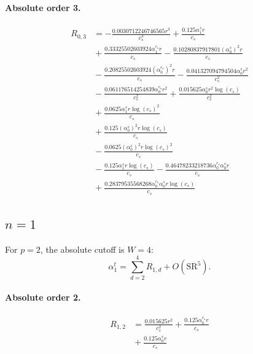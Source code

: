 \documentclass[10pt]{article}
\begin{document}
\paragraph{Absolute order 3.}
\begin{align*}
R_{0,3} &=  - \frac{0.0030712246746565 r^{3}}{c_{s}^{3}} + \frac{0.125 \alpha_{1}^s r}{c_{s}} \\
&{}  + \frac{0.33325502603924 \alpha_{1}^{c_s} r}{c_{s}} - \frac{0.10280837917801 \left(\alpha_{0}^s\right)^{2} r}{c_{s}} \\
&{}  - \frac{0.20825502603924 \left(\alpha_{0}^{c_s}\right)^{2} r}{c_{s}} - \frac{0.041327094794504 \alpha_{0}^s r^{2}}{c_{s}^{2}} \\
&{}  - \frac{0.061176514254839 \alpha_{0}^{c_s} r^{2}}{c_{s}^{2}} + \frac{0.015625 \alpha_{0}^s r^{2} \log{\left(c_{s} \right)}}{c_{s}^{2}} \\
&{}  + \frac{0.0625 \alpha_{1}^s r \log{\left(c_{s} \right)}^{2}}{c_{s}} \\
&{}  + \frac{0.125 \left(\alpha_{0}^s\right)^{2} r \log{\left(c_{s} \right)}}{c_{s}} \\
&{}  - \frac{0.0625 \left(\alpha_{0}^s\right)^{2} r \log{\left(c_{s} \right)}^{2}}{c_{s}} \\
&{}  - \frac{0.125 \alpha_{1}^s r \log{\left(c_{s} \right)}}{c_{s}} - \frac{0.46478233218736 \alpha_{0}^{c_s} \alpha_{0}^s r}{c_{s}} \\
&{}  + \frac{0.28379535568268 \alpha_{0}^{c_s} \alpha_{0}^s r \log{\left(c_{s} \right)}}{c_{s}}
\end{align*}

\subsection{$n=1$}
For $p=2$, the absolute cutoff is $W=4$:
\[\alpha_{1}^t=\sum_{d=2}^{4}R_{1,d}+O(\mathrm{SR}^{5}).\]
\paragraph{Absolute order 2.}
\begin{align*}
R_{1,2} &= \frac{0.015625 r^{2}}{c_{s}^{2}} + \frac{0.125 \alpha_{0}^{c_s} r}{c_{s}} \\
&{}  + \frac{0.125 \alpha_{0}^s r}{c_{s}}
\end{align*}
\end{document}

